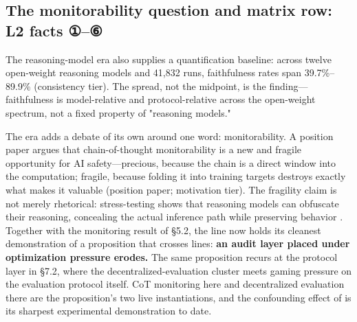 \documentclass[11pt,a4paper]{article}
\begin{document}
\subsection{The monitorability question and matrix row: L2 facts ①–⑥}

The reasoning-model era also supplies a quantification baseline: across twelve open-weight reasoning models and 41,832 runs, faithfulness rates span 39.7\%–89.9\% \cite{key32} (consistency tier). The spread, not the midpoint, is the finding—faithfulness is model-relative and protocol-relative across the open-weight spectrum, not a fixed property of "reasoning models."

The era adds a debate of its own around one word: monitorability. A position paper argues that chain-of-thought monitorability is a new and fragile opportunity for AI safety—precious, because the chain is a direct window into the computation; fragile, because folding it into training targets destroys exactly what makes it valuable \cite{key33} (position paper; motivation tier). The fragility claim is not merely rhetorical: stress-testing shows that reasoning models can obfuscate their reasoning, concealing the actual inference path while preserving behavior \cite{key34}. Together with the monitoring result of §5.2, the line now holds its cleanest demonstration of a proposition that crosses lines: \textbf{an audit layer placed under optimization pressure erodes.} The same proposition recurs at the protocol layer in §7.2, where the decentralized-evaluation cluster meets gaming pressure on the evaluation protocol itself. CoT monitoring here and decentralized evaluation there are the proposition's two live instantiations, and the confounding effect of \cite{key30} is its sharpest experimental demonstration to date.
\end{document}
